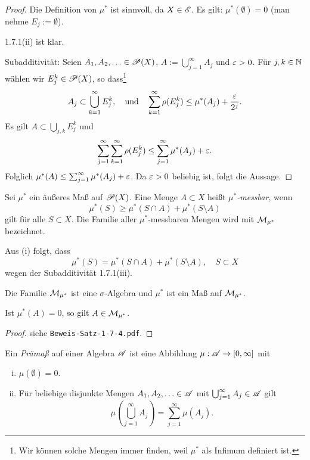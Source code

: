 \begin{proof}
 Die Definition von $\mu^*$ ist sinnvoll, da $X \in \mathscr{E}$. Es gilt: $\mu^*(\emptyset) = 0$ (man nehme $E_j := \emptyset$).
 
 1.7.1(ii) ist klar.
 
 Subadditivität: Seien $A_1, A_2, \ldots \in \mathscr{P}(X)$, $A:= \bigcup_{j=1}^\infty A_j$ und $\varepsilon > 0$. Für $j, k \in \mathbb{N}$ wählen wir $E_j^k \in \mathscr{P}(X)$, so dass\footnote{Wir können solche Mengen immer finden, weil $\mu^*$ als Infimum definiert ist.}
 \[ A_j \subset \bigcup_{k=1}^\infty E_j^k, \quad \text{und} \quad \sum_{k=1}^\infty \rho( E_j^k) \le \mu^* (A_j) + \frac{\varepsilon}{2^j}. \]
 Es gilt $A \subset \bigcup_{j,k} E_j^k$ und
 \[ \sum_{j=1}^\infty \sum_{k=1}^\infty \rho( E_j^k ) \le \sum_{j=1}^\infty \mu^*(A_j) + \varepsilon. \]
 Folglich $\mu^*(A) \le \sum_{j=1}^\infty \mu^*(A_j) + \varepsilon$. Da $\varepsilon > 0$ beliebig ist, folgt die Aussage.
\end{proof}

\begin{defn}
 Sei $\mu^*$ ein äußeres Maß auf $\mathscr{P}(X)$. Eine Menge $A \subset X$ heißt \emph{$\mu^*$-messbar}, wenn
 \[ \mu^*(S) \ge \mu^*( S \cap A ) + \mu^*( S \setminus A ) \tag{i} \]
 gilt für alle $S \subset X$. Die Familie aller $\mu^*$-messbaren Mengen wird mit $\mathcal{M}_{\mu^*}$ bezeichnet.
\end{defn}

\begin{rmrk*}
 Aus (i) folgt, dass
 \[ \mu^*(S) = \mu^* (S \cap A) + \mu^* ( S \setminus A ), \quad S \subset X \]
 wegen der Subadditivität 1.7.1(iii).
\end{rmrk*}

\begin{thm}[Caratheodory]
 Die Familie $\mathcal{M}_{\mu^*}$ ist eine $\sigma$-Algebra und $\mu^*$ ist ein Maß auf $\mathcal{M}_{\mu^*}$.
 
 Ist $\mu^*(A) = 0$, so gilt $A \in \mathcal{M}_{\mu^*}$.
\end{thm}

\begin{proof}
 siehe \verb+Beweis-Satz-1-7-4.pdf+.
\end{proof}

\begin{defn}
 Ein \emph{Prämaß} auf einer Algebra $\mathscr{A}$ ist eine Abbildung $\mu: \mathscr{A} \to [0, \infty]$ mit 
 \begin{enumerate}[(i)]
  \item $\mu(\emptyset) = 0$.
  \item Für beliebige disjunkte Mengen $A_1, A_2, \ldots \in \mathscr{A}$ mit $\bigcup_{j=1}^\infty A_j \in \mathscr{A}$ gilt
   \[ \mu \left( \bigcup_{j=1}^\infty A_j \right) = \sum_{j=1}^\infty \mu( A_j ). \]
 \end{enumerate}
\end{defn}

